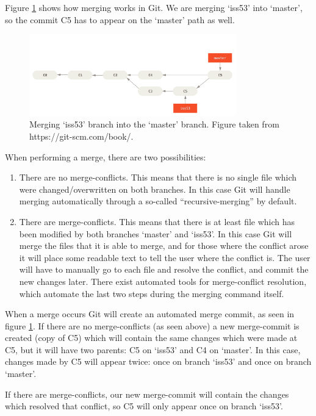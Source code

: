 \documentclass[12pt,twoside,notitlepage]{report}
\begin{document}
Figure \ref{basic-merging_git} shows how merging works in Git. We are merging `iss53' into `master', so the commit C5 has to appear on the `master' path as well.
\begin{figure}[ht!]
\includegraphics[width=0.8\textwidth]{basic-merging_git.png}
\centering

\captionsetup{width=0.8\textwidth}
\caption[Merging branches in Git]{Merging `iss53' branch into the `master' branch. Figure taken from https://git-scm.com/book/.}
\label{basic-merging_git}
\end{figure}

When performing a merge, there are two possibilities:
\begin{enumerate}
\item There are no merge-conflicts. This means that there is no single file which were changed/overwritten on both branches. In this case Git will handle merging automatically through a so-called ``recursive-merging'' by default.
\item There are merge-conflicts. This means that there is at least file which has been modified by both branches `master' and `iss53'. In this case Git will merge the files that it is able to merge, and for those where the conflict arose it will place some readable text to tell the user where the conflict is. The user will have to manually go to each file and resolve the conflict, and commit the new changes later. There exist automated tools for merge-conflict resolution, which automate the last two steps during the merging command itself.
\end{enumerate}

When a merge occurs Git will create an automated merge commit, as seen in figure \ref{basic-merging_git}. If there are no merge-conflicts (as seen above) a new merge-commit is created (copy of C5) which will contain the same changes which were made at C5, but it will have two parents: C5 on `iss53' and C4 on `master'. In this case, changes made by C5 will appear twice: once on branch `iss53' and once on branch `master'.

If there are merge-conflicts, our new merge-commit will contain the changes which resolved that conflict, so C5 will only appear once on branch `iss53'.
\end{document}
